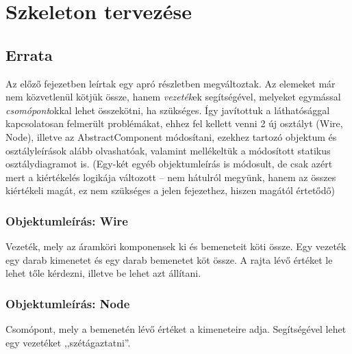 %
\chapter{Szkeleton tervezése}

\thispagestyle{fancy}

\section{Errata}

Az előző fejezetben leírtak egy apró részletben megváltoztak. Az elemeket már nem közvetlenül kötjük össze, hanem \textit{vezeték}ek segítségével, melyeket egymással \textit{csomópont}okkal lehet összekötni, ha szükséges. Így javítottuk a láthatósággal kapcsolatosan felmerült problémákat, ehhez fel kellett venni 2 új osztályt (Wire, Node), illetve az AbstractComponent módosítani, ezekhez tartozó objektum és osztályleírások alább olvashatóak, valamint mellékeltük a módosított statikus osztálydiagramot is. (Egy-két egyéb objektumleírás is módosult, de csak azért mert a kiértékelés logikája változott -- nem hátulról megyünk, hanem az összes kiértékeli magát, ez nem szükséges a jelen fejezethez, hiszen magától értetődő)

\subsection{Objektumleírás: \bf Wire}
Vezeték, mely az áramköri komponensek ki és bemeneteit köti össze. Egy vezeték egy darab kimenetet és egy darab bemenetet köt össze. A rajta lévő értéket le lehet tőle kérdezni, illetve be lehet azt állítani.

\subsection{Objektumleírás: \bf Node}
Csomópont, mely a bemenetén lévő értéket a kimeneteire adja. Segítségével lehet egy vezetéket ,,szétágaztatni''.

